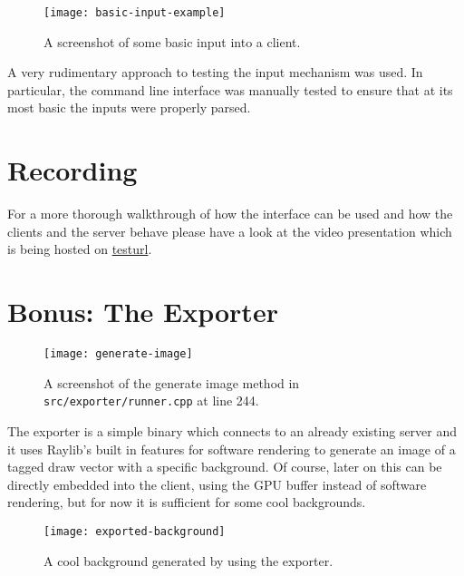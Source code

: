 \documentclass[article]{uom-coursework}
\begin{document}
\begin{figure}[H]
\centering
\texttt{[image: basic-input-example]}
\caption{A screenshot of some basic input into a client.}
\end{figure}

A very rudimentary approach to testing the input mechanism was
used. In particular, the command line interface was manually
tested to ensure that at its most basic the inputs were properly
parsed.

\section{Recording}

For a more thorough walkthrough of how the interface can be used
and how the clients and the server behave please have a look at
the video presentation which is being hosted on \url{testurl}.

\section{\textbf{Bonus}: The Exporter}

\begin{figure}[H]
\centering
\texttt{[image: generate-image]}
\caption{A screenshot of the generate image method in
\texttt{src/exporter/runner.cpp} at line 244.}
\end{figure}

The exporter is a simple binary which connects to an already
existing server and it uses Raylib's built in features for
software rendering to generate an image of a tagged draw vector
with a specific background. Of course, later on this can be
directly embedded into the client, using the GPU buffer instead
of software rendering, but for now it is sufficient for some
cool backgrounds.

\begin{figure}[H]
\centering
\texttt{[image: exported-background]}
\caption{A cool background generated by using the exporter.}
\end{figure}
\end{document}
